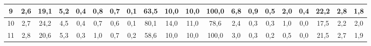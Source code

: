 \begin{sidewaystable}[]
\begin{tabular}{|c|c|c|c|c|c|c|c|c|c|c|c|c|c|c|c|c|c|c|c|}
    9  & 2,6                                              & 19,1                                             & 5,2                                              & 0,4                                              & 0,8                                              & 0,7                                              & 0,1                                              & 63,5                                            & 10,0                                            & 10,0                                            & 100,0                                           & 6,8                                             & 0,9                                             & 0,5                                             & 2,0                                             & 0,4                                             & 22,2                                             & 2,8                                              & 1,8                                              \\ \hline
    10 & 2,7                                              & 24,2                                             & 4,5                                              & 0,4                                              & 0,7                                              & 0,6                                              & 0,1                                              & 80,1                                            & 14,0                                            & 11,0                                            & 78,6                                            & 2,4                                             & 0,3                                             & 0,3                                             & 1,0                                             & 0,0                                             & 17,5                                             & 2,2                                              & 2,0                                              \\ \hline
    11 & 2,8                                              & 20,6                                             & 5,3                                              & 0,3                                              & 1,0                                              & 0,7                                              & 0,2                                              & 58,6                                            & 10,0                                            & 10,0                                            & 100,0                                           & 3,0                                             & 0,3                                             & 0,2                                             & 0,5                                             & 0,0                                             & 21,5                                             & 2,7                                              & 1,9                                              \\ \hline

\end{tabular}
\end{sidewaystable}
